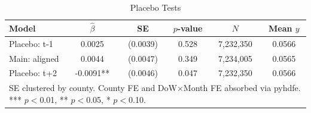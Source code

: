 \begin{table}[htbp]\centering
\caption{Placebo Tests}
\begin{tabular}{lccccc}
\hline\hline
Model & $\hat\beta$ & SE & $p$-value & $N$ & Mean $y$ \\
\midrule
Placebo: t-1 & 0.0025 & (0.0039) & 0.528 & 7,232,350 & 0.0566 \\
Main: aligned & 0.0044 & (0.0047) & 0.349 & 7,234,005 & 0.0565 \\
Placebo: t+2 & -0.0091** & (0.0046) & 0.047 & 7,232,350 & 0.0566 \\
\hline\hline
\multicolumn{6}{p{0.9\textwidth}}{\footnotesize SE clustered by county. County FE and DoW$\times$Month FE absorbed via pyhdfe. *** $p{<}$0.01, ** $p{<}$0.05, * $p{<}$0.10.} \\
\end{tabular}
\end{table}